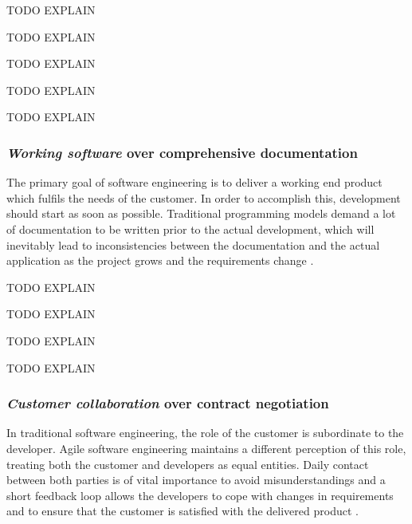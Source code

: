 TODO EXPLAIN

TODO EXPLAIN

TODO EXPLAIN

TODO EXPLAIN

TODO EXPLAIN

\subsubsection{\emph{Working software} over comprehensive documentation}
The primary goal of software engineering is to deliver a working end product which fulfils the needs of the customer. In order to accomplish this, development should start as soon as possible. Traditional programming models demand a lot of documentation to be written prior to the actual development, which will inevitably lead to inconsistencies between the documentation and the actual application as the project grows and the requirements change \cite{Hazzan2014}. 
	
TODO EXPLAIN

TODO EXPLAIN

TODO EXPLAIN

TODO EXPLAIN

\subsubsection{\emph{Customer collaboration} over contract negotiation}
In traditional software engineering, the role of the customer is subordinate to the developer. Agile software engineering maintains a different perception of this role, treating both the customer and developers as equal entities. Daily contact between both parties is of vital importance to avoid misunderstandings and a short feedback loop allows the developers to cope with changes in requirements and to ensure that the customer is satisfied with the delivered product \cite{Hazzan2014}.

